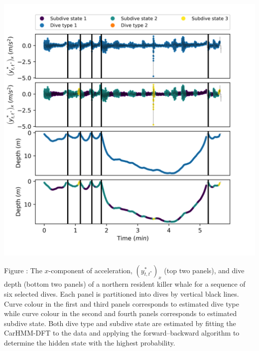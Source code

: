 \documentclass{article}
\begin{document}
        \begin{center}
        \includegraphics[width=6in]{../Plots/2019/20190902-182840-CATs_OB_1_0_267_CarHMM_decoded_dives.png}
        \end{center}
        
        \noindent Figure : The $x$-component of acceleration, $(y^*_{t,t^*})_x$ (top two panels), and dive depth (bottom two panels) of a northern resident killer whale for a sequence of six selected dives. Each panel is partitioned into dives by vertical black lines. Curve colour in the first and third panels corresponds to estimated dive type while curve colour in the second and fourth panels corresponds to estimated subdive state. Both dive type and subdive state are estimated by fitting the CarHMM-DFT to the data and applying the forward--backward algorithm to determine the hidden state with the highest probability.
        \addtocounter{fignum}{1}
        
\end{document}
